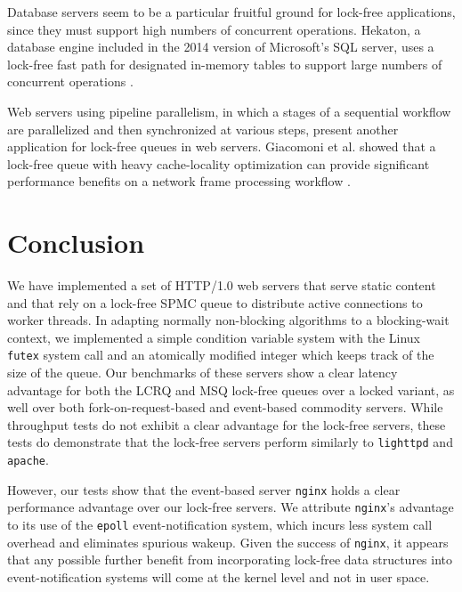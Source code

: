 \documentclass[twoside,10pt]{article}
\begin{document}
\begin{multicols}{2}
Database servers seem to be a particular fruitful ground for lock-free
applications, since they must support high numbers of concurrent
operations. Hekaton, a database engine included in the 2014 version of
Microsoft's SQL server, uses a lock-free fast path for designated
in-memory tables to support large numbers of concurrent operations
\cite{diaconu2013hekaton}.

Web servers using pipeline parallelism, in which a stages of a
sequential workflow are parallelized and then synchronized at various
steps, present another application for lock-free queues in web
servers. Giacomoni et al. showed that a lock-free queue with heavy
cache-locality optimization can provide significant performance
benefits on a network frame processing workflow
\cite{giacomoni2008fastforward}.

\section{Conclusion}

We have implemented a set of HTTP/1.0 web servers that serve static
content and that rely on a lock-free SPMC queue to distribute active
connections to worker threads. In adapting normally non-blocking
algorithms to a blocking-wait context, we implemented a simple
condition variable system with the Linux \verb+futex+ system call and
an atomically modified integer which keeps track of the size of the
queue. Our benchmarks of these servers show a clear latency advantage
for both the LCRQ and MSQ lock-free queues over a locked variant, as
well over both fork-on-request-based and event-based commodity
servers. While throughput tests do not exhibit a clear advantage for
the lock-free servers, these tests do demonstrate that the lock-free
servers perform similarly to \verb+lighttpd+ and \verb+apache+.

However, our tests show that the event-based server \verb+nginx+ holds
a clear performance advantage over our lock-free servers. We attribute
\verb+nginx+'s advantage to its use of the \verb+epoll+
event-notification system, which incurs less system call overhead and
eliminates spurious wakeup. Given the success of \verb+nginx+, it
appears that any possible further benefit from incorporating lock-free
data structures into event-notification systems will come at the kernel
level and not in user space.

\end{multicols}

{\small
  
  
}
\end{document}

